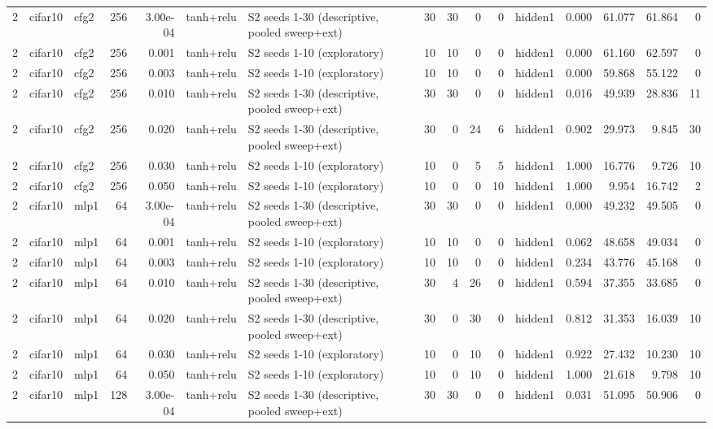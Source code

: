 \begin{table}[htbp]
{\begin{tabular}{@{}rllrrllrrrrlrrrr@{}}
2 & cifar10 & cfg2 & 256 & 3.00e-04 & tanh+relu & S2 seeds 1-30 (descriptive, pooled sweep+ext) & 30 & 30 & 0 & 0 & hidden1 & 0.000 & 61.077 & 61.864 & 0 \\
2 & cifar10 & cfg2 & 256 & 0.001 & tanh+relu & S2 seeds 1-10 (exploratory) & 10 & 10 & 0 & 0 & hidden1 & 0.000 & 61.160 & 62.597 & 0 \\
2 & cifar10 & cfg2 & 256 & 0.003 & tanh+relu & S2 seeds 1-10 (exploratory) & 10 & 10 & 0 & 0 & hidden1 & 0.000 & 59.868 & 55.122 & 0 \\
2 & cifar10 & cfg2 & 256 & 0.010 & tanh+relu & S2 seeds 1-30 (descriptive, pooled sweep+ext) & 30 & 30 & 0 & 0 & hidden1 & 0.016 & 49.939 & 28.836 & 11 \\
2 & cifar10 & cfg2 & 256 & 0.020 & tanh+relu & S2 seeds 1-30 (descriptive, pooled sweep+ext) & 30 & 0 & 24 & 6 & hidden1 & 0.902 & 29.973 & 9.845 & 30 \\
2 & cifar10 & cfg2 & 256 & 0.030 & tanh+relu & S2 seeds 1-10 (exploratory) & 10 & 0 & 5 & 5 & hidden1 & 1.000 & 16.776 & 9.726 & 10 \\
2 & cifar10 & cfg2 & 256 & 0.050 & tanh+relu & S2 seeds 1-10 (exploratory) & 10 & 0 & 0 & 10 & hidden1 & 1.000 & 9.954 & 16.742 & 2 \\
2 & cifar10 & mlp1 & 64 & 3.00e-04 & tanh+relu & S2 seeds 1-30 (descriptive, pooled sweep+ext) & 30 & 30 & 0 & 0 & hidden1 & 0.000 & 49.232 & 49.505 & 0 \\
2 & cifar10 & mlp1 & 64 & 0.001 & tanh+relu & S2 seeds 1-10 (exploratory) & 10 & 10 & 0 & 0 & hidden1 & 0.062 & 48.658 & 49.034 & 0 \\
2 & cifar10 & mlp1 & 64 & 0.003 & tanh+relu & S2 seeds 1-10 (exploratory) & 10 & 10 & 0 & 0 & hidden1 & 0.234 & 43.776 & 45.168 & 0 \\
2 & cifar10 & mlp1 & 64 & 0.010 & tanh+relu & S2 seeds 1-30 (descriptive, pooled sweep+ext) & 30 & 4 & 26 & 0 & hidden1 & 0.594 & 37.355 & 33.685 & 0 \\
2 & cifar10 & mlp1 & 64 & 0.020 & tanh+relu & S2 seeds 1-30 (descriptive, pooled sweep+ext) & 30 & 0 & 30 & 0 & hidden1 & 0.812 & 31.353 & 16.039 & 10 \\
2 & cifar10 & mlp1 & 64 & 0.030 & tanh+relu & S2 seeds 1-10 (exploratory) & 10 & 0 & 10 & 0 & hidden1 & 0.922 & 27.432 & 10.230 & 10 \\
2 & cifar10 & mlp1 & 64 & 0.050 & tanh+relu & S2 seeds 1-10 (exploratory) & 10 & 0 & 10 & 0 & hidden1 & 1.000 & 21.618 & 9.798 & 10 \\
2 & cifar10 & mlp1 & 128 & 3.00e-04 & tanh+relu & S2 seeds 1-30 (descriptive, pooled sweep+ext) & 30 & 30 & 0 & 0 & hidden1 & 0.031 & 51.095 & 50.906 & 0 \\

\end{tabular}}
\end{table}
